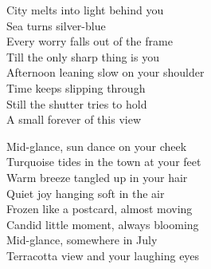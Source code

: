 \begin{lyrics}
City melts into light behind you\\
Sea turns silver-blue\\
Every worry falls out of the frame\\
Till the only sharp thing is you\\
Afternoon leaning slow on your shoulder\\
Time keeps slipping through\\
Still the shutter tries to hold\\
A small forever of this view

Mid-glance, sun dance on your cheek\\
Turquoise tides in the town at your feet\\
Warm breeze tangled up in your hair\\
Quiet joy hanging soft in the air\\
Frozen like a postcard, almost moving\\
Candid little moment, always blooming\\
Mid-glance, somewhere in July\\
Terracotta view and your laughing eyes
\end{lyrics}

